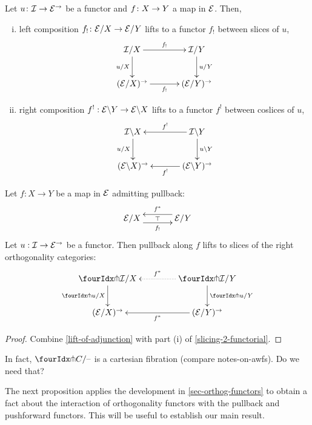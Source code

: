 \documentclass[reqno,10pt,a4paper,oneside]{amsart}
\begin{document}
\begin{lemma}
\label{slicing-2-functorial}
Let $u \colon \mathcal{I} \to \mathcal{E}^{\to}$ be a functor and $f \colon X \to Y$ a map in $\mathcal{E}$. Then, 
\begin{enumerate}[(i)]
\item left composition $f_! \colon \mathcal{E}/X \to \mathcal{E}/Y$ lifts to a functor $f_!$ between slices of $u$,
\[
\xymatrix@C+1em{
  \cal{I}/X
  \ar[r]^-{f_!}
  \ar[d]_{u/X}
&
  \cal{I}/Y
  \ar[d]^{u/Y}
\\
  (\calE/X)^{\to}
  \ar[r]_-{f_!}
&
  (\calE/Y)^{\to}
}
\]
\item right composition $f^! : \mathcal{E} \backslash Y \to \mathcal{E} \backslash X$ lifts to a functor $f^!$ between coslices of $u$,
\[
\xymatrix@C+1em{
  \cal{I} \backslash X
  \ar[d]_{u/X}
&
  \cal{I} \backslash Y
  \ar[l]_-{f^!}
  \ar[d]^{u \backslash Y}
\\
  (\calE \backslash X)^{\to}
&
  (\calE \backslash Y)^{\to}
  \ar[l]^-{f^!}
}
\]
\end{enumerate}
\end{lemma}

\begin{proposition}
\label{lift-pullback}
Let $f : X \to Y$ be a map in $\mathcal{E}$ admitting pullback:
\[
\xymatrix@C+1em{
  \catE/X
  \ar@<-5pt>[r]_{f_!}
  \ar@{}[r]|{\top}
&
  \catE/Y
  \ar@<-5pt>[l]_{f^*}
}
\]
Let $u : \mathcal{I} \to \mathcal{E}^{\to}$ be a functor.
Then pullback along $f$ lifts to slices of the right orthogonality categories:
\[
\xymatrix@C=1.5cm{
  \liftr{\cal{I}}/X
  \ar[d]_{\liftr{u}/X}
&
  \liftr{\cal{I}}/Y
  \ar@{.>}[l]_{f^*}
  \ar[d]^{\liftr{u}/Y}
\\
  (\catE/X)^{\to}
&
  (\catE/Y)^{\to}
  \ar[l]^{f^*}
}
\]
\end{proposition}

\begin{proof}
Combine \cref{lift-of-adjunction} with part (i) of \cref{slicing-2-functorial}.
\end{proof}

\begin{question}
In fact, $\liftr{C}/\text{--}$ is a cartesian fibration (compare notes-on-awfs).
Do we need that?
\end{question}

The next proposition applies the development in \cref{sec-orthog-functors} to obtain 
a fact about the interaction of orthogonality functors with the pullback and pushforward
functors. This will be useful to establish our main result.
\end{document}
